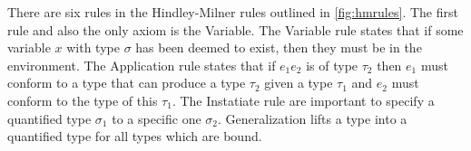 \documentclass[11pt,oneside,a4paper]{report}
\begin{document}
There are six rules in the Hindley-Milner rules outlined in \autoref{fig:hmrules}.
The first rule and also the only axiom is the Variable.
The Variable rule states that if some variable $x$ with type $\sigma$ has been deemed to exist, then they must be in the environment.
The Application rule states that if $e_1 e_2$ is of type $\tau_2$ then $e_1$ must conform to a type that can produce a type $\tau_2$ given a type $\tau_1$ and $e_2$ must conform to the type of this $\tau_1$.
The Instatiate rule are important to specify a quantified type $\sigma_1$ to a specific one $\sigma_2$.
Generalization lifts a type into a quantified type for all types which are bound.
\end{document}
